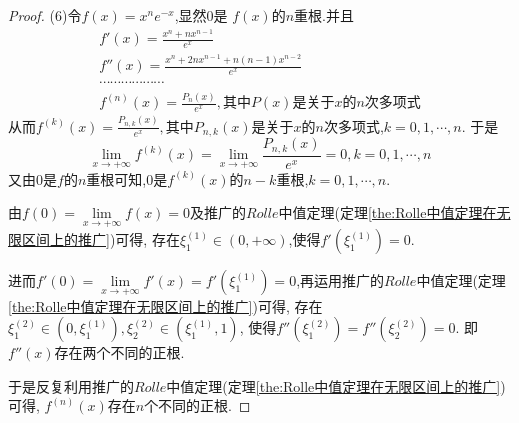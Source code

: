 \documentclass[lang=cn,newtx,10pt,scheme=chinese]{elegantbook}
\begin{document}
\begin{exercise}
\begin{proof}
    (6)令$f\left( x \right) =x^ne^{-x}$,显然$0$是
    $f(x)$的$n$重根.并且
    \begin{gather}
            f'\left( x \right) =\frac{x^n+nx^{n-1}}{e^x}
            \nonumber\\
f''\left( x \right) =\frac{x^n+2nx^{n-1}+n\left( n-1 \right) x^{n-2}}{e^x}
\nonumber\\
\cdots \cdots \cdots \cdots \cdots \cdots 
\nonumber\\
f^{\left( n \right)}\left( x \right) =\frac{P_n\left( x \right)}{e^x},\text{其中}P\left( x \right) \text{是关于}x\text{的}n\text{次多项式}
\nonumber
    \end{gather}
    从而$f^{\left( k \right)}\left( x \right) =\frac{P_{n,k}\left( x \right)}{e^x},\text{其中}P_{n,k}\left( x \right) \text{是关于}x\text{的}n\text{次多项式}$,$k=0,1,\cdots,n$.
    于是
    \begin{equation}
        \underset{x\rightarrow +\infty}{\lim}f^{\left( k \right)}\left( x \right) =\underset{x\rightarrow +\infty}{\lim}\frac{P_{n,k}\left( x \right)}{e^x}=0,k=0,1,\cdots ,n
        \nonumber
    \end{equation}
    又由0是$f$的$n$重根可知,$0$是$f^{\left( k \right)}\left( x \right)$的$n-k$重根,$k=0,1,\cdots,n$.

    由$f\left( 0 \right) =\underset{x\rightarrow +\infty}{\lim}f\left( x \right) =0$及推广的$Rolle$中值定理(定理\ref{the:Rolle中值定理在无限区间上的推广})可得,
    存在$\xi _{1}^{\left( 1 \right)}\in(0,+\infty)$,使得$f'(\xi _{1}^{\left( 1 \right)})=0$.
    
    进而$f'\left( 0 \right) =\underset{x\rightarrow +\infty}{\lim}f'\left( x \right) =f'\left( \xi _{1}^{\left( 1 \right)} \right) =0$,再运用推广的$Rolle$中值定理(定理\ref{the:Rolle中值定理在无限区间上的推广})可得,
    存在$\xi _{1}^{\left( 2 \right)}\in \left( 0,\xi _{1}^{\left( 1 \right)} \right) ,\xi _{2}^{\left( 2 \right)}\in \left( \xi _{1}^{\left( 1 \right)},1 \right) $,
    使得$f''\left( \xi _{1}^{\left( 2 \right)} \right) =f''\left( \xi _{2}^{\left( 2 \right)} \right) =0$.
    即$f''(x)$存在两个不同的正根.

    于是反复利用推广的$Rolle$中值定理(定理\ref{the:Rolle中值定理在无限区间上的推广})可得,
    $f^{(n)}(x)$存在$n$个不同的正根.

\end{proof}
\end{exercise}
\end{document}
